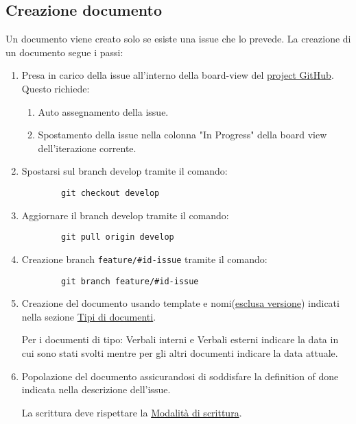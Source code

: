 \documentclass[a4paper, 12pt]{article}
\begin{document}
\subsection{Creazione documento}
\label{subsec:cre}
Un documento viene creato solo se esiste una issue che lo prevede.
La creazione di un documento segue i passi:
\begin{enumerate}
    \item Presa in carico della issue all'interno della board-view del \href{https://github.com/orgs/ALT-F4-eng/projects}{project GitHub}.
    Questo richiede:
    \begin{enumerate}
        \item Auto assegnamento della issue.
        \item Spostamento della issue nella colonna "In Progress" della board view dell'iterazione corrente.
    \end{enumerate}

    \item Spostarsi sul branch develop tramite il comando:
    \begin{lstlisting}
        git checkout develop
    \end{lstlisting}
     
    \item Aggiornare il branch develop tramite il comando: 
    \begin{lstlisting}
        git pull origin develop
    \end{lstlisting}
    
    \item Creazione branch \lstinline|feature/#id-issue| tramite il comando:
    \begin{lstlisting}
        git branch feature/#id-issue
    \end{lstlisting}

    \item Creazione del documento usando template e nomi(\underline{esclusa versione}) indicati nella sezione \hyperref[subsec:docs]{Tipi di documenti}.
    
    Per i documenti di tipo: Verbali interni e Verbali esterni indicare la data in cui sono stati svolti mentre per gli altri documenti indicare la data attuale.
    
    \item Popolazione del documento assicurandosi di soddisfare la definition of done indicata nella descrizione dell'issue.
    
    La scrittura deve rispettare la \hyperref[subsec:mods]{Modalità di scrittura}. 
    

\end{enumerate}
\end{document}
